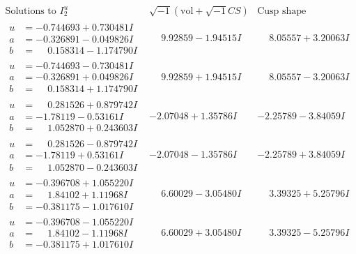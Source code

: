 \documentclass[1p]{elsarticle_modified}
\theoremstyle{definition}
\newcommand{\I}{\sqrt{-1}}
\begin{document}
$$\begin{array}{c|c|c}  
\text{Solutions to }I^u_{2}& \I (\text{vol} + \sqrt{-1}CS) & \text{Cusp shape}\\
 \hline 
\begin{aligned}
u &= -0.744693 + 0.730481 I \\
a &= -0.326891 - 0.049826 I \\
b &= \phantom{-}0.158314 - 1.174790 I\end{aligned}
 & \phantom{-}9.92859 - 1.94515 I & \phantom{-}8.05557 + 3.20063 I \\ \hline\begin{aligned}
u &= -0.744693 - 0.730481 I \\
a &= -0.326891 + 0.049826 I \\
b &= \phantom{-}0.158314 + 1.174790 I\end{aligned}
 & \phantom{-}9.92859 + 1.94515 I & \phantom{-}8.05557 - 3.20063 I \\ \hline\begin{aligned}
u &= \phantom{-}0.281526 + 0.879742 I \\
a &= -1.78119 - 0.53161 I \\
b &= \phantom{-}1.052870 + 0.243603 I\end{aligned}
 & -2.07048 + 1.35786 I & -2.25789 - 3.84059 I \\ \hline\begin{aligned}
u &= \phantom{-}0.281526 - 0.879742 I \\
a &= -1.78119 + 0.53161 I \\
b &= \phantom{-}1.052870 - 0.243603 I\end{aligned}
 & -2.07048 - 1.35786 I & -2.25789 + 3.84059 I \\ \hline\begin{aligned}
u &= -0.396708 + 1.055220 I \\
a &= \phantom{-}1.84102 + 1.11968 I \\
b &= -0.381175 - 1.017610 I\end{aligned}
 & \phantom{-}6.60029 - 3.05480 I & \phantom{-}3.39325 + 5.25796 I \\ \hline\begin{aligned}
u &= -0.396708 - 1.055220 I \\
a &= \phantom{-}1.84102 - 1.11968 I \\
b &= -0.381175 + 1.017610 I\end{aligned}
 & \phantom{-}6.60029 + 3.05480 I & \phantom{-}3.39325 - 5.25796 I \\ \hline\begin{aligned}

\end{aligned}
\end{array}$$
\end{document}
